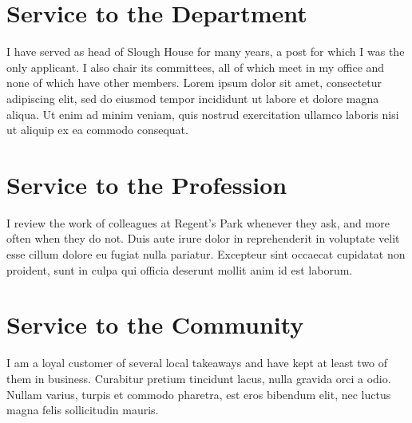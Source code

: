 \documentclass[11pt]{article}
\begin{document}
\makeletterhead
{}
\preparedfor


\section{Service to the Department}
I have served as head of Slough House for many years, a post for which I was the only applicant. I also chair its committees, all of which meet in my office and none of which have other members. Lorem ipsum dolor sit amet, consectetur adipiscing elit, sed do eiusmod tempor incididunt ut labore et dolore magna aliqua. Ut enim ad minim veniam, quis nostrud exercitation ullamco laboris nisi ut aliquip ex ea commodo consequat.

\section{Service to the Profession}
I review the work of colleagues at Regent's Park whenever they ask, and more often when they do not. Duis aute irure dolor in reprehenderit in voluptate velit esse cillum dolore eu fugiat nulla pariatur. Excepteur sint occaecat cupidatat non proident, sunt in culpa qui officia deserunt mollit anim id est laborum.

\section{Service to the Community}
I am a loyal customer of several local takeaways and have kept at least two of them in business. Curabitur pretium tincidunt lacus, nulla gravida orci a odio. Nullam varius, turpis et commodo pharetra, est eros bibendum elit, nec luctus magna felis sollicitudin mauris.
\end{document}
